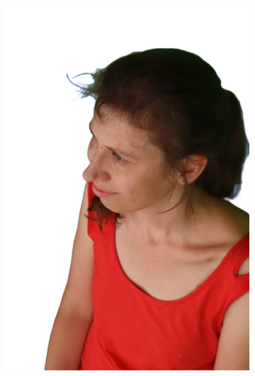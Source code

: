 \begin{figure}[!ht]
\begin{subfigure}{0.12\linewidth}
        \includegraphics[width=\textwidth]{Figures/results/initials/dora/22_render.png}

\end{subfigure}
\end{figure}
